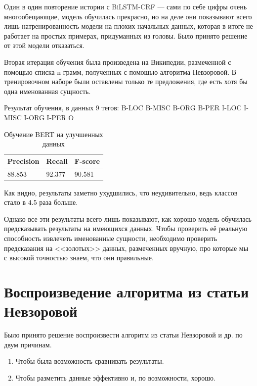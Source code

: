\vspace{1cm}

Один в один повторение истории с BiLSTM-CRF --- сами по себе цифры очень многообещающие, модель обучилась прекрасно, но на деле они показывают всего лишь натренированность модели на плохих начальных данных, которая в итоге не работает на простых примерах, придуманных из головы. Было принято решение от этой модели отказаться. %

Вторая итерация обучения была произведена на Википедии, размеченной с помощью списка n-грамм, полученных с помощью алгоритма Невзоровой. В тренировочном наборе были оставлены только те предложения, где есть хотя бы одна именованная сущность.

Результат обучения, в данных 9 тегов:
B-LOC
B-MISC
B-ORG
B-PER
I-LOC
I-MISC
I-ORG
I-PER
O

\vspace{1cm}
\begin{table}[h]
\begin{tabular}{| l | l | l |}
\hline
Precision  &   Recall   &  F-score     \\

\hline
88.853    & 92.377    & 90.581        \\
\hline
\end{tabular}
\caption{Обучение BERT на улучшенных данных}
\end{table}

 \vspace{1cm}

Как видно, результаты заметно ухудшились, что неудивительно, ведь классов стало в $4.5$ раза больше.

Однако все эти результаты всего лишь показывают, как хорошо модель обучилась предсказывать результаты на имеющихся данных. Чтобы проверить её реальную способность извлечеть именованные сущности, необходимо проверить предсказания на <<золотых>> данных, размеченных вручную, про которые мы с высокой точностью знаем, что они правильные.


\section{Воспроизведение алгоритма из статьи Невзоровой}

Было принято решение воспроизвести алгоритм из статьи Невзоровой и др. \cite{Nevzorova} по двум причинам.

\begin{enumerate}
\item Чтобы была возможность сравнивать результаты.
\item Чтобы разметить данные эффективно и, по возможности, хорошо.
\end{enumerate}


